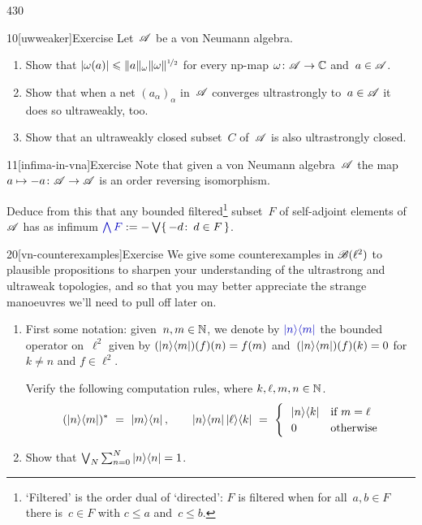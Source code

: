 \begin{parsec}{430}%
\begin{point}{10}[uwweaker]{Exercise}%
Let~$\scrA$ be a von Neumann algebra.
\begin{enumerate}
\item
Show that 
$\left|\omega(a)\right|\leq \|a\|_\omega \|\omega\|^{\nicefrac{1}{2}}$
for every np-map $\omega\colon \scrA\to\C$
and~$a\in\scrA$.
\item
Show that when a net $(a_\alpha)_\alpha$
in~$\scrA$ converges ultrastrongly to~$a\in \scrA$
it does so ultraweakly, too.
\item
Show that an ultraweakly closed subset~$C$ of~$\scrA$
is also ultrastrongly closed.
\end{enumerate}
\end{point}
\begin{point}{11}[infima-in-vna]{Exercise}%
Note that given a von Neumann algebra~$\scrA$
the map $a\mapsto -a\colon \scrA\to\scrA$ 
is an order reversing isomorphism.

Deduce from this that any bounded filtered\footnote{`Filtered' is the
order dual of `directed':
    $F$ is
filtered when
for all~$a,b\in F$ there is~$c\in F$ with $c\leq a$ and~$c\leq b$.}
subset~$F$
of self-adjoint elements of~$\scrA$
has as infimum $\Define{\bigwedge F} := -\bigvee\{\,-d\colon \,d\in F\,\}$.%
\end{point}
\begin{point}{20}[vn-counterexamples]{Exercise}%
We give some counterexamples in $\scrB(\ell^2)$
to plausible propositions
to sharpen your understanding of the ultrastrong and ultraweak topologies,
and so that you may better appreciate
the strange manoeuvres we'll need to pull off later on.
\begin{enumerate}
\item
First some notation: given~$n,m\in \N$,
we denote by $\Define{\ketbra{n}{m}}$%
the bounded operator on~$\ell^2$
given by $(\ketbra{n}{m})(f)(n)=f(m)$
and~$(\ketbra{n}{m})(f)(k)=0$ for $k\neq n$
and $f\in \ell^2$.

Verify the following computation rules,
where $k,\ell,m,n\in \N$.
\begin{equation*}
(\ketbra{n}{m})^*\ =\ \ketbra{m}{n},
\qquad
\ketbra{n}{m}\ketbra{\ell}{k}\ =\ 
\begin{cases}
\ \ \ketbra{n}{k} & \text{if $m=\ell$} \\
\ \ 0 & \text{otherwise}
\end{cases}
\end{equation*}
\item
Show that $\bigvee_N \sum_{n=0}^N \ketbra{n}{n}=1$.


\end{enumerate}
\end{point}
\end{parsec}
